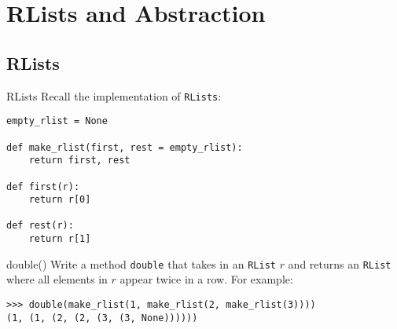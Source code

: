 \documentclass[9pt]{beamer}
\begin{document}
\section{RLists and Abstraction}
\subsection{RLists}
\begin{frame}[fragile]{RLists}
  Recall the implementation of {\tt RLists}:

  \begin{lstlisting}
empty_rlist = None

def make_rlist(first, rest = empty_rlist):
    return first, rest

def first(r):
    return r[0]

def rest(r):
    return r[1]
  \end{lstlisting}
\end{frame}



\begin{frame}[fragile]{double()}
  Write a method {\tt double} that takes in an {\tt RList} $r$ and returns
  an {\tt RList} where all elements in $r$ appear twice in a row. For
  example:

  \begin{lstlisting}[numbers=none, frame=none, xleftmargin=0pt]
>>> double(make_rlist(1, make_rlist(2, make_rlist(3))))
(1, (1, (2, (2, (3, (3, None))))))
  \end{lstlisting}

\end{frame}
\end{document}
